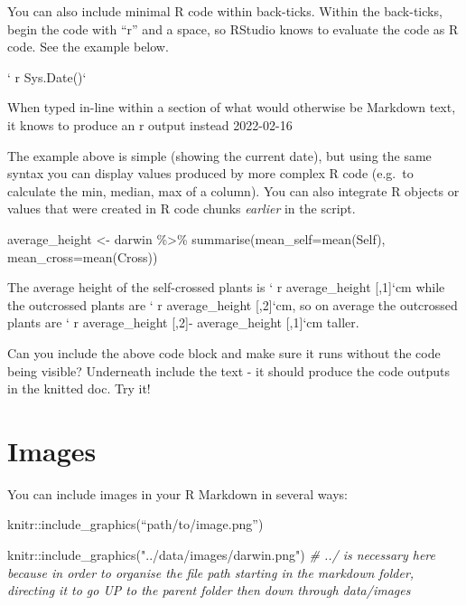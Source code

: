 \documentclass[
]{book}
\makeatletter
\newenvironment{Shaded}{\begin{snugshade}}{\end{snugshade}}
\newcommand{\AttributeTok}[1]{\textcolor[rgb]{0.77,0.63,0.00}{#1}}
\newcommand{\CommentTok}[1]{\textcolor[rgb]{0.56,0.35,0.01}{\textit{#1}}}
\newcommand{\FunctionTok}[1]{\textcolor[rgb]{0.00,0.00,0.00}{#1}}
\newcommand{\NormalTok}[1]{#1}
\newcommand{\OtherTok}[1]{\textcolor[rgb]{0.56,0.35,0.01}{#1}}
\newcommand{\SpecialCharTok}[1]{\textcolor[rgb]{0.00,0.00,0.00}{#1}}
\newcommand{\StringTok}[1]{\textcolor[rgb]{0.31,0.60,0.02}{#1}}
\newenvironment{kframe}{%
\medskip{}
\setlength{\fboxsep}{.8em}
 \def\at@end@of@kframe{}%
 \ifinner\ifhmode%
  \def\at@end@of@kframe{\end{minipage}}%
  \begin{minipage}{\columnwidth}%
 \fi\fi%
 \def\FrameCommand##1{\hskip\@totalleftmargin \hskip-\fboxsep
 \colorbox{shadecolor}{##1}\hskip-\fboxsep
     \hskip-\linewidth \hskip-\@totalleftmargin \hskip\columnwidth}%
 \MakeFramed {\advance\hsize-\width
   \@totalleftmargin\z@ \linewidth\hsize
   \@setminipage}}%
 {\par\unskip\endMakeFramed%
 \at@end@of@kframe}
\newenvironment{block}[1]
  {
  \begin{itemize}
  \renewcommand{\labelitemi}{
    \raisebox{-.7\height}[0pt][0pt]{
      {\setkeys{Gin}{width=3em,keepaspectratio}\texttt{[image: images/\#1]}}
    }
  }
  \setlength{\fboxsep}{1em}
  \begin{kframe}
  \item
  }
  {
  \end{kframe}
  \end{itemize}
  }
\newenvironment{rmdquestion}
  {\begin{block}{question}}
  {\end{block}}
\makeatother
\begin{document}
You can also include minimal R code within back-ticks. Within the back-ticks, begin the code with ``r'' and a space, so RStudio knows to evaluate the code as R code. See the example below.

` r Sys.Date()`

When typed in-line within a section of what would otherwise be Markdown text, it knows to produce an r output instead 2022-02-16

The example above is simple (showing the current date), but using the same syntax you can display values produced by more complex R code (e.g.~to calculate the min, median, max of a column). You can also integrate R objects or values that were created in R code chunks \emph{earlier} in the script.

\begin{Shaded}
\begin{Highlighting}[]
\NormalTok{average\_height }\OtherTok{\textless{}{-}}\NormalTok{ darwin }\SpecialCharTok{\%\textgreater{}\%} 
  \FunctionTok{summarise}\NormalTok{(}\AttributeTok{mean\_self=}\FunctionTok{mean}\NormalTok{(Self),}
            \AttributeTok{mean\_cross=}\FunctionTok{mean}\NormalTok{(Cross))}
\end{Highlighting}
\end{Shaded}

The average height of the self-crossed plants is ` r average\_height {[},1{]}`cm while the outcrossed plants are ` r average\_height {[},2{]}`cm, so on average the outcrossed plants are ` r average\_height {[},2{]}- average\_height {[},1{]}`cm taller.

\begin{rmdquestion}
Can you include the above code block and make sure it runs without the
code being visible? Underneath include the text - it should produce the
code outputs in the knitted doc. Try it!
\end{rmdquestion}

\hypertarget{images}{%
\section{Images}\label{images}}

You can include images in your R Markdown in several ways:

knitr::include\_graphics(``path/to/image.png'')

\begin{Shaded}
\begin{Highlighting}[]
\NormalTok{knitr}\SpecialCharTok{::}\FunctionTok{include\_graphics}\NormalTok{(}\StringTok{"../data/images/darwin.png"}\NormalTok{)}
\CommentTok{\# ../ is necessary here because in order to organise the file path starting in the markdown folder, directing it to go UP to the parent folder then down through data/images}
\end{Highlighting}
\end{Shaded}
\end{document}

